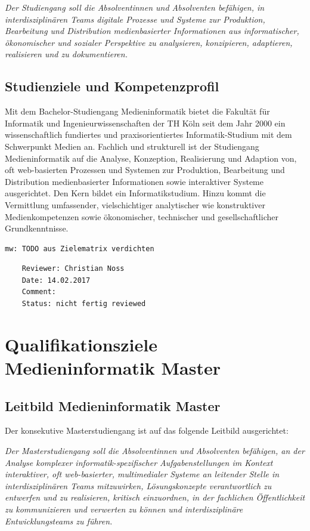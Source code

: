 \emph{Der Studiengang soll die Absolventinnen und Absolventen befähigen,
in interdisziplinären Teams digitale Prozesse und Systeme zur
Produktion, Bearbeitung und Distribution medienbasierter Informationen
aus informatischer, ökonomischer und sozialer Perspektive zu
analysieren, konzipieren, adaptieren, realisieren und zu dokumentieren.}

\section{Studienziele und
Kompetenzprofil}\label{studienziele-und-kompetenzprofil}

Mit dem Bachelor-Studiengang Medieninformatik bietet die Fakultät für
Informatik und Ingenieurwissenschaften der TH Köln seit dem Jahr 2000
ein wissenschaftlich fundiertes und praxisorientiertes
Informatik-Studium mit dem Schwerpunkt Medien an. Fachlich und
strukturell ist der Studiengang Medieninformatik auf die Analyse,
Konzeption, Realisierung und Adaption von, oft web-basierten Prozessen
und Systemen zur Produktion, Bearbeitung und Distribution
medienbasierter Informationen sowie interaktiver Systeme ausgerichtet.
Den Kern bildet ein Informatikstudium. Hinzu kommt die Vermittlung
umfassender, vielschichtiger analytischer wie konstruktiver
Medienkompetenzen sowie ökonomischer, technischer und gesellschaftlicher
Grundkenntnisse.

\begin{verbatim}
mw: TODO aus Zielematrix verdichten
\end{verbatim}

\begin{verbatim}
    Reviewer: Christian Noss
    Date: 14.02.2017
    Comment: 
    Status: nicht fertig reviewed
\end{verbatim}

\chapter{Qualifikationsziele Medieninformatik
Master}\label{qualifikationsziele-medieninformatik-master}

\section{Leitbild Medieninformatik
Master}\label{leitbild-medieninformatik-master}

Der konsekutive Masterstudiengang ist auf das folgende Leitbild
ausgerichtet:

\emph{Der Masterstudiengang soll die Absolventinnen und Absolventen
befähigen, an der Analyse komplexer informatik-spezifischer
Aufgabenstellungen im Kontext interaktiver, oft web-basierter,
multimedialer Systeme an leitender Stelle in interdisziplinären Teams
mitzuwirken, Lösungskonzepte verantwortlich zu entwerfen und zu
realisieren, kritisch einzuordnen, in der fachlichen Öffentlichkeit zu
kommunizieren und verwerten zu können und interdisziplinäre
Entwicklungsteams zu führen.}

